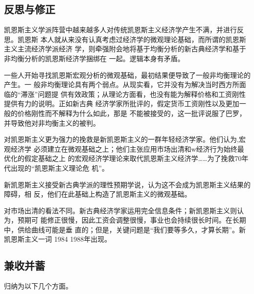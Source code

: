 \subsection{反思与修正}

凯恩斯主义学派阵营中越来越多人对传统凯恩斯主义经济学产生不满，并进行反思。凯恩斯
本人就从来没有认真考虑过经济学的微观理论基础，而所谓的凯恩斯主义主流经济学派经济
学，则牵强附会地将基于均衡分析的新古典经济学和基于非均衡分析的凯恩斯经济学捆绑在
一起。逻辑本身有矛盾。

一些人开始寻找凯恩斯宏观分析的微观基础，最初结果便导致了一般非均衡理论的产生。一
般非均衡理论具有两个弱点。从现实看，它并没有为解决当时西方所面临的“滞涨”问题提
供有效政策；从理论方面看，也没有能为解释价格和工资刚性提供有力的说明。正如新古典
经济学家所批评的，假定货币工资刚性以及更加一般的价格刚性而不解释为什么如此，那是
不能被接受的，这一批评说服了巴罗，并导致他对非均衡主义的被判。

对凯恩斯主义更为强力的挽救是新凯恩斯主义的一群年轻经济学家。他们认为,宏观经济学
必须建立在微观基础之上；他们主张应用市场出清和w经济行为始终最优化的假定基础之上
的宏观经济学理论来取代凯恩斯主义经济学……为了挽救70年代出现的“凯恩斯主义理论危
机”。

新凯恩斯主义接受新古典学派的理性预期学说，认为这不会成为凯恩斯主义结果的障碍，相
反，他们在此基础上构造了凯恩斯主义的微观基础。

对市场出清的看法不同。新古典经济学家运用完全信息条件；新凯恩斯主义则认为，预期可
能修正很慢，因此工资会调整很慢，事业也会持续很长时间。在长期中，供给曲线可能是垂
直的；但是，关键问题是“我们要等多久，才算长期”。新凯恩斯主义一词 1984 1988年出现。

\subsection{兼收并蓄}

归纳为以下几个方面。

